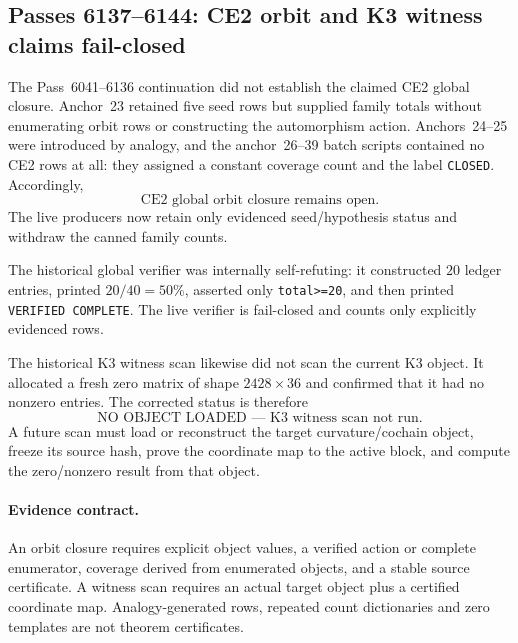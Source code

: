 \subsection*{Passes 6137--6144: CE2 orbit and K3 witness claims fail-closed}

The Pass~6041--6136 continuation did not establish the claimed CE2 global
closure.  Anchor~23 retained five seed rows but supplied family totals without
enumerating orbit rows or constructing the automorphism action.  Anchors~24--25
were introduced by analogy, and the anchor~26--39 batch scripts contained no CE2
rows at all: they assigned a constant coverage count and the label \texttt{CLOSED}.
Accordingly,
\[
\boxed{\text{CE2 global orbit closure remains open}.}
\]
The live producers now retain only evidenced seed/hypothesis status and withdraw
the canned family counts.

The historical global verifier was internally self-refuting: it constructed
$20$ ledger entries, printed $20/40=50\%$, asserted only \texttt{total>=20}, and
then printed \texttt{VERIFIED COMPLETE}.  The live verifier is fail-closed and
counts only explicitly evidenced rows.

The historical K3 witness scan likewise did not scan the current K3 object.  It
allocated a fresh zero matrix of shape $2428\times36$ and confirmed that it had
no nonzero entries.  The corrected status is therefore
\[
\boxed{\text{NO OBJECT LOADED --- K3 witness scan not run}.}
\]
A future scan must load or reconstruct the target curvature/cochain object,
freeze its source hash, prove the coordinate map to the active block, and compute
the zero/nonzero result from that object.

\paragraph{Evidence contract.}
An orbit closure requires explicit object values, a verified action or complete
enumerator, coverage derived from enumerated objects, and a stable source
certificate.  A witness scan requires an actual target object plus a certified
coordinate map.  Analogy-generated rows, repeated count dictionaries and zero
templates are not theorem certificates.
